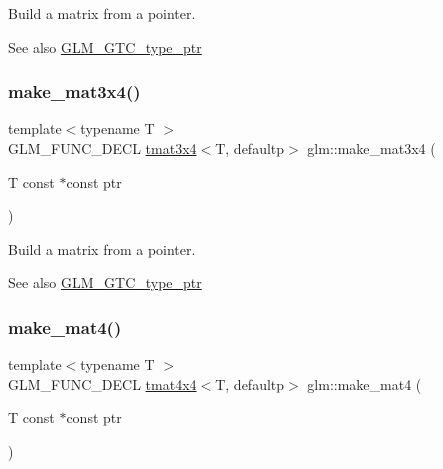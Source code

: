 Build a matrix from a pointer. \begin{DoxySeeAlso}{See also}
\hyperlink{group__gtc__type__ptr}{G\+L\+M\+\_\+\+G\+T\+C\+\_\+type\+\_\+ptr} 
\end{DoxySeeAlso}
\mbox{\label{group__gtc__type__ptr_gac083edd180ab4d4b817acc60c516209b}} 
\subsubsection{\texorpdfstring{make\+\_\+mat3x4()}{make\_mat3x4()}}
{\footnotesize\ttfamily template$<$typename T $>$ \\
G\+L\+M\+\_\+\+F\+U\+N\+C\+\_\+\+D\+E\+CL \hyperlink{structglm_1_1tmat3x4}{tmat3x4}$<$T, defaultp$>$ glm\+::make\+\_\+mat3x4 (\begin{DoxyParamCaption}\item[{T const $\ast$const}]{ptr }\end{DoxyParamCaption})}

Build a matrix from a pointer. \begin{DoxySeeAlso}{See also}
\hyperlink{group__gtc__type__ptr}{G\+L\+M\+\_\+\+G\+T\+C\+\_\+type\+\_\+ptr} 
\end{DoxySeeAlso}
\mbox{\label{group__gtc__type__ptr_ga2c6e6d457cb932e1ce683e4f690a6f60}} 
\subsubsection{\texorpdfstring{make\+\_\+mat4()}{make\_mat4()}}
{\footnotesize\ttfamily template$<$typename T $>$ \\
G\+L\+M\+\_\+\+F\+U\+N\+C\+\_\+\+D\+E\+CL \hyperlink{structglm_1_1tmat4x4}{tmat4x4}$<$T, defaultp$>$ glm\+::make\+\_\+mat4 (\begin{DoxyParamCaption}\item[{T const $\ast$const}]{ptr }\end{DoxyParamCaption})}

